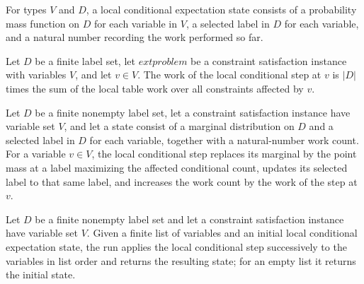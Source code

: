 \begin{definition}
\label{FABL.LocalConditionalExpectationState}
\leanok
For types $V$ and $D$, a local conditional expectation state consists of a probability
mass function on $D$ for each variable in $V$, a selected label in $D$ for each
variable, and a natural number recording the work performed so far.
\end{definition}

\begin{definition}
\label{FABL.CSPInstance.localConditionalStepWork}
\leanok
{}
Let $D$ be a finite label set, let $	ext{problem}$ be a constraint satisfaction instance
with variables $V$, and let $v\in V$. The work of the local conditional step at $v$ is
$|D|$ times the sum of the local table work over all constraints affected by $v$.
\end{definition}

\begin{definition}
\label{FABL.CSPInstance.localConditionalStep}
\leanok
{}
Let $D$ be a finite nonempty label set, let a constraint satisfaction instance have
variable set $V$, and let a state consist of a marginal distribution on $D$ and a
selected label in $D$ for each variable, together with a natural-number work count. For
a variable $v\in V$, the local conditional step replaces its marginal by the point mass
at a label maximizing the affected conditional count, updates its selected label to that
same label, and increases the work count by the work of the step at $v$.
\end{definition}

\begin{definition}
\label{FABL.CSPInstance.runLocalConditionalSteps}
\leanok
{}
Let $D$ be a finite nonempty label set and let a constraint satisfaction instance have
variable set $V$. Given a finite list of variables and an initial local conditional
expectation state, the run applies the local conditional step successively to the
variables in list order and returns the resulting state; for an empty list it returns
the initial state.
\end{definition}

